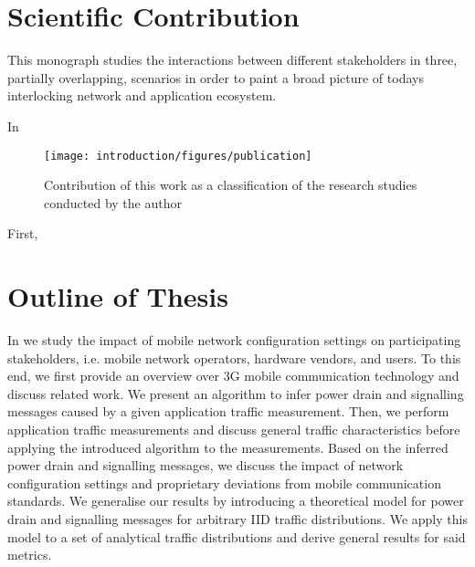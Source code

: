 \section{Scientific Contribution}
This monograph studies the interactions between different stakeholders in three, partially overlapping, scenarios in order to paint a broad picture of todays interlocking network and application ecosystem.

In 

\begin{figure}
\centering
\texttt{[image: introduction/figures/publication]}
\caption{Contribution of this work as a classification of the research studies conducted by the author}\label{fig:introduction:publications}
\end{figure}

First, 

\section{Outline of Thesis}

In  we study the impact of mobile network configuration settings on participating stakeholders, i.e. mobile network operators, hardware vendors, and users.
To this end, we first provide an overview over \gls{3G} mobile communication technology and discuss related work.
We present an algorithm to infer power drain and signalling messages caused by a given application traffic measurement.
Then, we perform application traffic measurements and discuss general traffic characteristics before applying the introduced algorithm to the measurements.
Based on the inferred power drain and signalling messages, we discuss the impact of network configuration settings and proprietary deviations from mobile communication standards.
We generalise our results by introducing a theoretical model for power drain and signalling messages for arbitrary \gls{IID} traffic distributions.
We apply this model to a set of analytical traffic distributions and derive general results for said metrics. 

